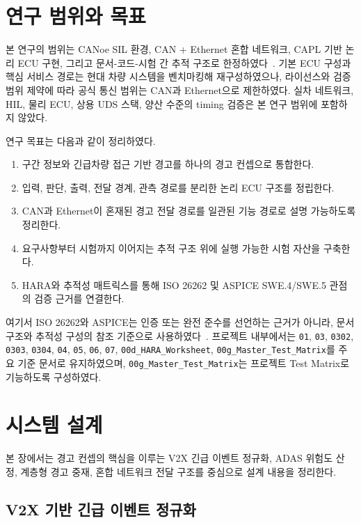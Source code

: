 \documentclass[10pt,a4paper,twocolumn]{article}
\begin{document}
\section{연구 범위와 목표}

본 연구의 범위는 CANoe SIL 환경, CAN + Ethernet 혼합 네트워크, CAPL 기반 논리 ECU 구현, 그리고 문서-코드-시험 간 추적 구조로 한정하였다~\cite{canoe}. 기본 ECU 구성과 핵심 서비스 경로는 현대 차량 시스템을 벤치마킹해 재구성하였으나, 라이선스와 검증 범위 제약에 따라 공식 통신 범위는 CAN과 Ethernet으로 제한하였다. 실차 네트워크, HIL, 물리 ECU, 상용 UDS 스택, 양산 수준의 timing 검증은 본 연구 범위에 포함하지 않았다.

연구 목표는 다음과 같이 정리하였다.

\begin{enumerate}[label=\arabic*.]
\item 구간 정보와 긴급차량 접근 기반 경고를 하나의 경고 컨셉으로 통합한다.
\item 입력, 판단, 출력, 전달 경계, 관측 경로를 분리한 논리 ECU 구조를 정립한다.
\item CAN과 Ethernet이 혼재된 경고 전달 경로를 일관된 기능 경로로 설명 가능하도록 정리한다.
\item 요구사항부터 시험까지 이어지는 추적 구조 위에 실행 가능한 시험 자산을 구축한다.
\item HARA와 추적성 매트릭스를 통해 ISO 26262 및 ASPICE SWE.4/SWE.5 관점의 검증 근거를 연결한다.
\end{enumerate}

여기서 ISO 26262와 ASPICE는 인증 또는 완전 준수를 선언하는 근거가 아니라, 문서 구조와 추적성 구성의 참조 기준으로 사용하였다~\cite{iso26262,aspice_spice,aspice_training}. 프로젝트 내부에서는 \texttt{01}, \texttt{03}, \texttt{0302}, \texttt{0303}, \texttt{0304}, \texttt{04}, \texttt{05}, \texttt{06}, \texttt{07}, \texttt{00d\_HARA\_Worksheet}, \texttt{00g\_Master\_Test\_Matrix}를 주요 기준 문서로 유지하였으며, \texttt{00g\_Master\_Test\_Matrix}는 프로젝트 Test Matrix로 기능하도록 구성하였다.

\section{시스템 설계}

본 장에서는 경고 컨셉의 핵심을 이루는 V2X 긴급 이벤트 정규화, ADAS 위험도 산정, 계층형 경고 중재, 혼합 네트워크 전달 구조를 중심으로 설계 내용을 정리한다.

\subsection{V2X 기반 긴급 이벤트 정규화}
\end{document}

